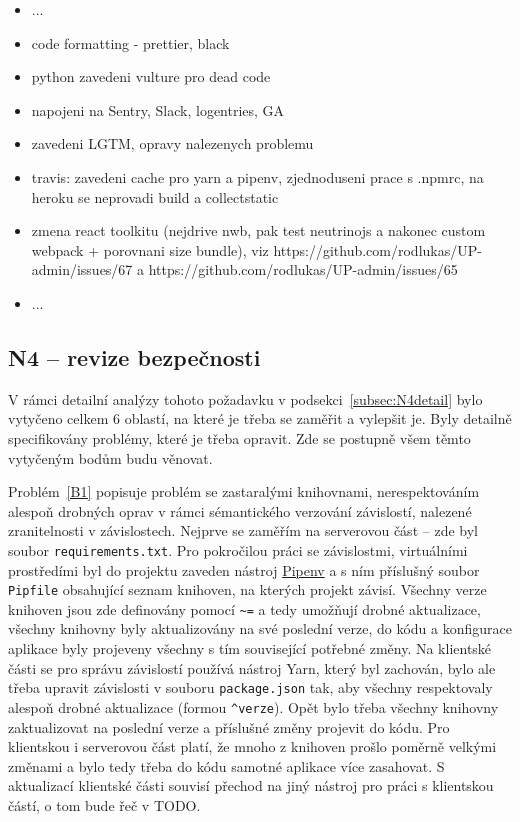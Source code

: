 \begin{itemize}
\item ...
\item code formatting - prettier, black
\item python zavedeni vulture pro dead code
\item napojeni na Sentry, Slack, logentries, GA
\item zavedeni LGTM, opravy nalezenych problemu
\item travis: zavedeni cache pro yarn a pipenv, zjednoduseni prace s .npmrc, na heroku se neprovadi build a collectstatic
\item zmena react toolkitu (nejdrive nwb, pak test neutrinojs a nakonec custom webpack + porovnani size bundle), viz https://github.com/rodlukas/UP-admin/issues/67 a https://github.com/rodlukas/UP-admin/issues/65
\item ...
\end{itemize}

\subsection{N4 -- revize bezpečnosti}

V rámci detailní analýzy tohoto požadavku v podsekci~\ref{subsec:N4detail} bylo vytyčeno celkem 6 oblastí, na které je třeba se zaměřit a vylepšit je. Byly detailně specifikovány problémy, které je třeba opravit. Zde se postupně všem těmto vytyčeným bodům budu věnovat.

Problém~\ref{B1} popisuje problém se zastaralými knihovnami, nerespektováním alespoň drobných oprav v rámci sémantického verzování závislostí, nalezené zranitelnosti v závislostech. Nejprve se zaměřím na serverovou část -- zde byl soubor \verb|requirements.txt|. Pro pokročilou práci se závislostmi, virtuálními prostředími \cite{pipenv-realpython} byl do projektu zaveden nástroj \href{https://pipenv.pypa.io/en/latest/}{Pipenv} a s ním příslušný soubor \verb|Pipfile| obsahující seznam knihoven, na kterých projekt závisí. Všechny verze knihoven jsou zde definovány pomocí \verb|~=| a tedy umožňují drobné aktualizace, všechny knihovny byly aktualizovány na své poslední verze, do kódu a konfigurace aplikace byly projeveny všechny s tím související potřebné změny. Na klientské části se pro správu závislostí používá nástroj Yarn, který byl zachován, bylo ale třeba upravit závislosti v souboru \verb|package.json| tak, aby všechny respektovaly alespoň drobné aktualizace (formou \verb|^verze|). Opět bylo třeba všechny knihovny zaktualizovat na poslední verze a příslušné změny projevit do kódu. Pro klientskou i serverovou část platí, že mnoho z knihoven prošlo poměrně velkými změnami a bylo tedy třeba do kódu samotné aplikace více zasahovat. S aktualizací klientské části souvisí přechod na jiný nástroj pro práci s klientskou částí, o tom bude řeč v TODO.

